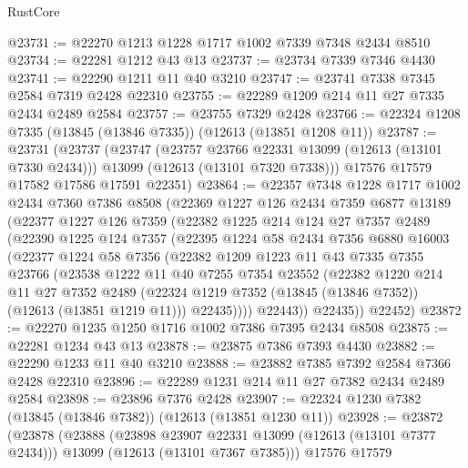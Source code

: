 \begin{lexlean}{RustCore}
\begin{coremodule}
@23731 := @22270 @1213 @1228 @1717 @1002 @7339 @7348 @2434 @8510
@23734 := @22281 @1212 @43 @13
@23737 := @23734 @7339 @7346 @4430
@23741 := @22290 @1211 @11 @40 @3210
@23747 := @23741 @7338 @7345 @2584 @7319 @2428 @22310
@23755 := @22289 @1209 @214 @11 @27 @7335 @2434 @2489 @2584
@23757 := @23755 @7329 @2428
@23766 := @22324 @1208 @7335 (@13845 (@13846 @7335)) (@12613 (@13851 @1208 @11))
@23787 := @23731
    (@23737
      (@23747
        (@23757 @23766 @22331 @13099 (@12613 (@13101 @7330 @2434)))
        @13099
        (@12613 (@13101 @7320 @7338)))
      @17576
      @17579
      @17582
      @17586
      @17591
      @22351)
@23864 := @22357
    @7348
    @1228
    @1717
    @1002
    @2434
    @7360
    @7386
    @8508
    (@22369
      @1227
      @126
      @2434
      @7359
      @6877
      @13189
      (@22377
        @1227
        @126
        @7359
        (@22382
          @1225
          @214
          @124
          @27
          @7357
          @2489
          (@22390
            @1225
            @124
            @7357
            (@22395
              @1224
              @58
              @2434
              @7356
              @6880
              @16003
              (@22377
                @1224
                @58
                @7356
                (@22382
                  @1209
                  @1223
                  @11
                  @43
                  @7335
                  @7355
                  @23766
                  (@23538
                    @1222
                    @11
                    @40
                    @7255
                    @7354
                    @23552
                    (@22382
                      @1220
                      @214
                      @11
                      @27
                      @7352
                      @2489
                      (@22324 @1219 @7352 (@13845 (@13846 @7352)) (@12613 (@13851 @1219 @11)))
                      @22435))))
              @22443))
          @22435))
      @22452)
@23872 := @22270 @1235 @1250 @1716 @1002 @7386 @7395 @2434 @8508
@23875 := @22281 @1234 @43 @13
@23878 := @23875 @7386 @7393 @4430
@23882 := @22290 @1233 @11 @40 @3210
@23888 := @23882 @7385 @7392 @2584 @7366 @2428 @22310
@23896 := @22289 @1231 @214 @11 @27 @7382 @2434 @2489 @2584
@23898 := @23896 @7376 @2428
@23907 := @22324 @1230 @7382 (@13845 (@13846 @7382)) (@12613 (@13851 @1230 @11))
@23928 := @23872
    (@23878
      (@23888
        (@23898 @23907 @22331 @13099 (@12613 (@13101 @7377 @2434)))
        @13099
        (@12613 (@13101 @7367 @7385)))
      @17576
      @17579

\end{coremodule}
\end{lexlean}
